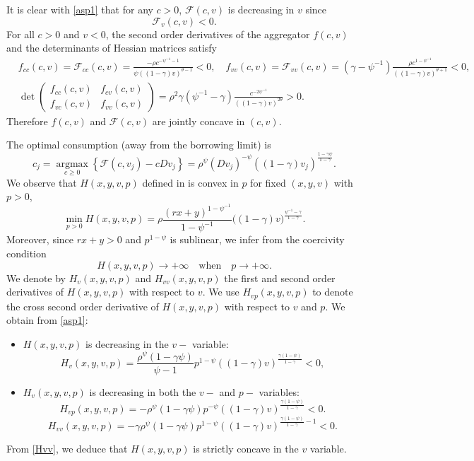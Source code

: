 \documentclass[11pt]{article}
\numberwithin{equation}{section}
\theoremstyle{definition}
\newcommand{\beq}{\begin{equation}}
\newcommand{\eeq}{\end{equation}}
\newcommand{\g}{\gamma}
\newcommand{\p}{\psi}
\theoremstyle{plain}
\begin{document}
It is clear with \eqref{asp1} that for any $c>0$, $\mathcal{F}(c,v)$ is decreasing in $v$ since 
\beq\label{F decreasing}
\mathcal{F}_v(c,v)<0.
\eeq
For all $c>0$ and $v<0$, the second order derivatives of the aggregator $f(c,v)$ and the determinants of Hessian matrices satisfy
\beq\label{Eq: f concave}
\begin{aligned}
&f_{cc}(c,v)=\mathcal{F}_{cc}(c,v)=\frac{-\rho c^{-\p^{-1}-1}}{\psi((1-\g)v)^{\theta-1}}<0,\quad f_{vv}(c,v)=\mathcal{F}_{vv}(c,v)=(\g-\psi^{-1})\frac{\rho c^{1-\p^{-1}}}{((1-\g)v)^{\theta+1}}<0,\\
&
{}{
\det
\begin{pmatrix}
f_{cc}(c,v) & f_{cv}(c,v) \\
f_{vc}(c,v) & f_{vv}(c,v)
\end{pmatrix}
=
\rho^2\g (\p^{-1}-\g)\frac{c^{-2\p^{-1}}}{((1-\g)v)^{2\theta}}
>0.
}
\end{aligned}
\eeq
Therefore $f(c,v)$ and $\mathcal{F}(c,v)$ are jointly concave in $(c,v)$.\par
	The optimal consumption (away from the borrowing limit) is 
	\beq\label{c optimal}
	c_j=\mathop{\arg\max}\limits_{c\geq 0} \left\{ \mathcal{F}(c,v_j) -cDv_j \right\}=\rho^{\p}(Dv_j)^{-\p}((1-\g)v_j)^{\frac{1-\g \p}{1-\g}}.
	\eeq
We observe that $H(x,y,v,p)$ defined in  is convex in $p$ for fixed $(x,y,v)$ with $p>0$,
\beq\label{H min}
\min_{p>0}H(x,y,v,p)=\rho\frac{(rx+y)^{1-\p^{-1}}}{1-\p^{-1}}\big((1-\g)v\big)^{\frac{\p^{-1}-\g}{1-\g}}.
\eeq
Moreover, since $rx+y>0$ and $p^{1-\p}$ is sublinear, we infer from  the coercivity condition
\beq\label{H coerc}
H(x,y,v,p)\to +\infty \quad \text{when}\quad  p\to +\infty.
\eeq
We denote by $H_v(x,y,v,p)$ and $H_{vv}(x,y,v,p)$ the first and second order derivatives of $H(x,y,v,p)$ with respect to $v$. We use $H_{vp}(x,y,v,p)$ to denote the cross second order derivative of $H(x,y,v,p)$ with respect to $v$ and $p$. We obtain from \eqref{asp1}:
\begin{itemize}
\item $H(x,y,v,p)$ is decreasing in the $v-$ variable:
\beq\label{Eq:Hv<0}
H_v(x,y,v,p)=\frac{\rho^{\p}(1-\g \p)}{\p-1} p^{1-\p}((1-\g)v)^{\frac{\g(1-\p)}{1-\g}}< 0,
\eeq
\item
$H_{v}(x,y,v,p)$ is decreasing in both the $v-$ and $p-$ variables: 
\beq\label{Hvp}
H_{vp}(x,y,v,p)=-\rho^{\p}(1-\g \p)p^{-\p}((1-\g)v)^{\frac{\g(1-\p)}{1-\g}}< 0.
\eeq
\beq\label{Hvv}
H_{vv}(x,y,v,p)=-\g \rho^{\p}(1-\g \p) p^{1-\p}((1-\g)v)^{\frac{\g(1-\p)}{1-\g}-1}< 0.
\eeq
\end{itemize}
From \cref{Hvv}, we deduce that $H(x,y,v,p)$ is strictly concave in the $v$ variable. \par
\end{document}
